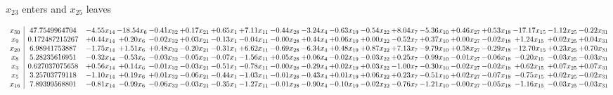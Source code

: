 \documentclass[9pt]{article}
\begin{document}
 $ x_{23} $ enters and $ x_{25} $ leaves 

 \[\begin{array}{c| c c@{\hskip 2pt} c@{\hskip 2pt} c@{\hskip 2pt} c@{\hskip 2pt} c@{\hskip 2pt} c@{\hskip 2pt} c@{\hskip 2pt} c@{\hskip 2pt} c@{\hskip 2pt} c@{\hskip 2pt} c@{\hskip 2pt} c@{\hskip 2pt} c@{\hskip 2pt} c@{\hskip 2pt} c@{\hskip 2pt} c@{\hskip 2pt} c@{\hskip 2pt} }
 x_{30}   &  47.7549964704 & -4.55 x_{14} & -18.54 x_{6} & -0.41 x_{32} & +  0.17 x_{21} & +  0.65 x_{1} & +  7.11 x_{11} & -0.44 x_{28} & -3.24 x_{4} & -0.63 x_{19} & -0.54 x_{22} & +  8.04 x_{7} & -5.36 x_{10} & +  0.46 x_{27} & +  0.53 x_{18} & -17.17 x_{15} & -1.12 x_{25} & -0.22 x_{31}\\
 x_{9}   &  0.172487215267 & +  0.44 x_{14} & +  0.20 x_{6} & -0.02 x_{32} & +  0.03 x_{21} & -0.13 x_{1} & -0.04 x_{11} & -0.00 x_{28} & +  0.44 x_{4} & +  0.06 x_{19} & +  0.00 x_{22} & -0.52 x_{7} & +  0.37 x_{10} & +  0.00 x_{27} & -0.02 x_{18} & +  1.24 x_{15} & +  0.02 x_{25} & +  0.04 x_{31}\\
 x_{20}   &  6.98941753887 & -1.75 x_{14} & +  1.51 x_{6} & +  0.48 x_{32} & -0.20 x_{21} & -0.31 x_{1} & +  6.62 x_{11} & -0.69 x_{28} & -6.34 x_{4} & +  0.48 x_{19} & +  0.87 x_{22} & +  7.13 x_{7} & -9.79 x_{10} & +  0.58 x_{27} & -0.29 x_{18} & -12.70 x_{15} & +  0.23 x_{25} & +  0.70 x_{31}\\
 x_{8}   &  5.28235616951 & -0.32 x_{14} & -0.53 x_{6} & -0.03 x_{32} & -0.05 x_{21} & -0.07 x_{1} & -1.56 x_{11} & +  0.05 x_{28} & +  0.06 x_{4} & -0.02 x_{19} & -0.03 x_{22} & +  0.25 x_{7} & -0.99 x_{10} & -0.01 x_{27} & -0.06 x_{18} & -0.20 x_{15} & -0.03 x_{25} & -0.03 x_{31}\\
 x_{3}   &  0.627037075658 & +  0.56 x_{14} & +  0.14 x_{6} & -0.01 x_{32} & -0.03 x_{21} & -0.51 x_{1} & -0.78 x_{11} & -0.00 x_{28} & -0.29 x_{4} & +  0.02 x_{19} & +  0.03 x_{22} & -1.00 x_{7} & -0.30 x_{10} & -0.02 x_{27} & -0.02 x_{18} & +  0.62 x_{15} & +  0.07 x_{25} & +  0.07 x_{31}\\
 x_{5}   &  3.25703779118 & -1.10 x_{14} & +  0.19 x_{6} & +  0.01 x_{32} & -0.06 x_{21} & -0.44 x_{1} & -1.03 x_{11} & -0.01 x_{28} & -0.43 x_{4} & +  0.01 x_{19} & +  0.06 x_{22} & +  0.23 x_{7} & -0.51 x_{10} & +  0.02 x_{27} & -0.07 x_{18} & -0.75 x_{15} & +  0.02 x_{25} & -0.02 x_{31}\\
 x_{16}   &  7.89399568801 & -0.81 x_{14} & -0.99 x_{6} & -0.06 x_{32} & -0.03 x_{21} & -0.35 x_{1} & -1.27 x_{11} & -0.01 x_{28} & -0.90 x_{4} & -0.10 x_{19} & -0.02 x_{22} & -0.76 x_{7} & -1.21 x_{10} & -0.00 x_{27} & -0.05 x_{18} & -1.16 x_{15} & -0.03 x_{25} & -0.03 x_{31}\\

\end{array}\]
\end{document}
